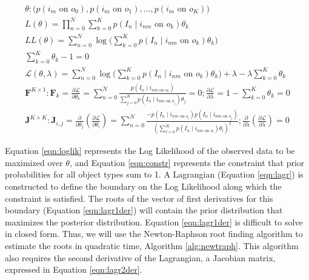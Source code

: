 \documentclass[11pt]{article}
\begin{document}
\begin{gather}
	\theta : \Big(p(i_m \textrm{ on } o_0), p(i_m \textrm{ on } o_1),
		\dots, p(i_m \textrm{ on } o_K)\Big) \\
	L(\theta) = \prod_{n=0}^{N} \sum_{k=0}^{K} p(I_n \mid i_{nm} 
		\textrm{ on } o_k) \theta_k \\
	LL(\theta) = \sum_{n=0}^{N} \log \Big( \sum_{k=0}^{K} 
		p(I_n \mid i_{nm} \textrm{ on } o_k) \theta_k \Big) \label{eqn:loglik}\\
	\sum_{k=0}^{K} \theta_k - 1 = 0 \label{eqn:constr}\\
	\mathcal{L}(\theta, \lambda) = \sum_{n=0}^{N} \log 
		\Big( \sum_{k=0}^{K} p(I_n \mid i_{nm} \textrm{ on } o_k) \theta_k \Big) + \lambda - \lambda \sum_{k=0}^{K} \theta_k \label{eqn:lagr}\\
	\mathbf{F}^{K \times 1}: \mathbf{F}_k = \frac{\partial \mathcal{L}}{\partial \theta_k} = 
		\sum_{n=0}^{N} \frac
			{p(I_n \mid i_{nm \textrm{ on } o_k})}
			{\sum_{j=0}^{K} p(I_n \mid i_{nm \textrm{ on } o_j}) \theta_j} = 0;
		\frac{\partial \mathcal{L}}{\partial \lambda} = 1 - \sum_{k=0}^{K} 
			\theta_k = 0 \label{eqn:lagr1der}\\
	\mathbf{J}^{K \times K}: \mathbf{J}_{i,j} = \frac{\partial}{\partial \theta_j} \left( \frac
		{\partial \mathcal{L}}{\partial \theta_i} \right) = 
		\sum_{n=0}^{N} \frac
			{-p(I_n \mid i_{nm \textrm{ on } o_i})p(I_n \mid i_{nm \textrm{ on } o_j})}
			{(\sum_{l=0}^{K} p(I_n \mid i_{nm \textrm{ on } o_l}) \theta_l)^2} \label{eqn:lagr2der};
		\frac{\partial}{\partial \lambda} \left( \frac{\partial \mathcal{L}}{\partial \lambda} \right) = 0
\end{gather}

Equation \ref{eqn:loglik} represents the Log Likelihood of the observed data to be maximized over $\theta$, and Equation \ref{eqn:constr} represents the constraint that prior probabilities for all object types sum to 1.  A Lagrangian (Equation \ref{eqn:lagr}) is constructed to define the boundary on the Log Likelihood along which the constraint is satisfied.  The roots of the vector of first derivatives for this boundary (Equation \ref{eqn:lagr1der}) will contain the prior distribution that maximizes the posterior distribution.  Equation \ref{eqn:lagr1der} is difficult to solve in closed form. Thus, we will use the Newton-Raphson root finding algorithm to estimate the roots in quadratic time, Algorithm \ref{alg:newtraph}.  This algorithm also requires the second derivative of the Lagrangian, a Jacobian matrix, expressed in Equation \ref{eqn:lagr2der}.
\end{document}
